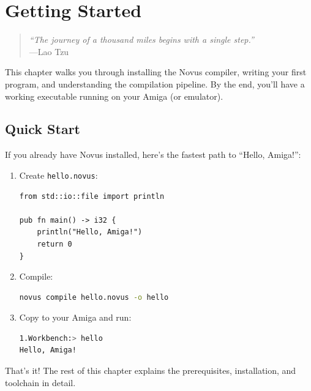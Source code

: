\chapter{Getting Started}
\label{ch:getting-started}

\begin{quote}
\textit{``The journey of a thousand miles begins with a single step.''}\\
---Lao Tzu
\end{quote}

\vspace{1em}

This chapter walks you through installing the Novus compiler, writing your first program, and understanding the compilation pipeline. By the end, you'll have a working executable running on your Amiga (or emulator).

\section{Quick Start}
\label{sec:quick-start}

If you already have Novus installed, here's the fastest path to ``Hello, Amiga!'':

\begin{enumerate}
\item Create \texttt{hello.novus}:
\begin{lstlisting}
from std::io::file import println

pub fn main() -> i32 {
    println("Hello, Amiga!")
    return 0
}
\end{lstlisting}

\item Compile:
\begin{lstlisting}[language=bash]
novus compile hello.novus -o hello
\end{lstlisting}

\item Copy to your Amiga and run:
\begin{lstlisting}[language=bash]
1.Workbench:> hello
Hello, Amiga!
\end{lstlisting}
\end{enumerate}

That's it! The rest of this chapter explains the prerequisites, installation, and toolchain in detail.


